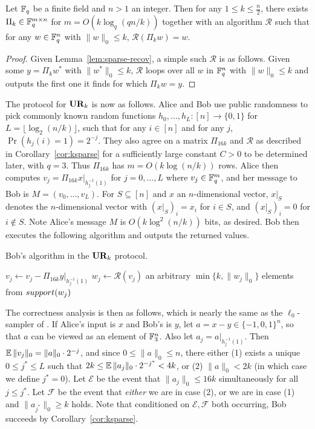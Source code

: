 \begin{corollary}\label{cor:ksparse}
Let $\mathbb{F}_q$ be a finite field and $n>1$ an integer. Then for any $1\le k\le \frac n2$, there exists $\Pi_k\in \mathbb{F}_q^{m\times n}$ for $m = O(k\log_q(qn/k))$ together with an algorithm $\mathcal{R}$ such that for any $w\in\mathbb{F}_q^n$ with $\|w\|_0 \le k$, $\mathcal{R}(\Pi_k w) = w$.
\end{corollary}
\begin{proof}
Given Lemma~\ref{lem:sparse-recov}, a simple such $\mathcal{R}$ is as follows. Given some $y = \Pi_k w^*$ with $\|w^*\|_0 \le k$, $\mathcal{R}$ loops over all $w$ in $\mathbb{F}_q^n$ with $\|w\|_0 \le k$ and outputs the first one it finds for which $\Pi_k w = y$.
\end{proof}

The protocol for $\mathbf{UR}_k$ is now as follows. Alice and Bob use public randomness to pick commonly known random functions $h_0,\ldots,h_L:[n]\rightarrow\{0,1\}$ for $L = \lfloor\log_2(n/k)\rfloor$, such that for any $i\in[n]$ and for any $j$, $\Pr(h_j(i) = 1) = 2^{-j}$. They also agree on a matrix $\Pi_{16k}$ and $\mathcal{R}$ as described in Corollary~\ref{cor:ksparse} for a sufficiently large constant $C>0$ to be determined later, with $q = 3$. Thus $\Pi_{16k}$ has $m = O(k\log(n/k))$ rows. Alice then computes $v_j = \Pi_{16k} x|_{h_j^{-1}(1)}$ for $j=0,\ldots,L$ where $v_j\in\mathbb{F}_q^m$, and her message to Bob is $M = (v_0,\ldots,v_L)$. For $S\subseteq [n]$ and $x$ an $n$-dimensional vector, $x|_S$ denotes the $n$-dimensional vector with $(x|_S)_i = x_i$ for $i\in S$, and $(x|_S)_i = 0$ for $i\notin S$. Note Alice's message $M$ is $O(k\log^2(n/k))$ bits, as desired. Bob then executes the following algorithm and outputs the returned values.

\begin{algorithm}[H] 
  \caption{Bob's algorithm in the $\mathbf{UR}_k$ protocol.} \label{algo:bob-protocol}
  \begin{algorithmic}[1]
      \State $v_j \leftarrow v_j - \Pi_{16k} y|_{h_j^{-1}(1)}$
      \State $w_j\leftarrow \mathcal{R}(v_j)$
      \State \Return an arbitrary $\min\{k, \|w_j\|_0\}$ elements from $\mathop{support}(w_j)$
      \EndIf
    \EndFor
    \EndProcedure
  \end{algorithmic}
\end{algorithm}

The correctness analysis is then as follows, which is nearly the same as the $\ell_0$-sampler of \cite{JowhariST11}. If Alice's input is $x$ and Bob's is $y$, let $a = x-y \in \{-1,0,1\}^n$, so that $a$ can be viewed as an element of $\mathbb{F}_3^n$. Also let $a_j = a|_{h_j^{-1}(1)}$. Then $\operatorname*{\mathbb{E}} \|v_j\|_0 = \|a\|_0\cdot 2^{-j}$, and since $0\le \|a\|_0 \le n$, there either (1) exists a unique $0\le j^*\le L$ such that $2k\le \operatorname*{\mathbb{E}}\|a_j\|_0\cdot 2^{-j^*}< 4k$, or (2) $\|a\|_0 < 2k$ (in which case we define $j^* = 0$). Let $\mathcal{E}$ be the event that $\|a_j\|_0 \le 16k$ simultaneously for all $j\le j^*$. Let $\mathcal{F}$ be the event that {\it either} we are in case (2), or we are in case (1) and $\|a_{j^*}\|_0 \ge k$ holds. Note that conditioned on $\mathcal{E}, \mathcal{F}$ both occurring, Bob succeeds by Corollary~\ref{cor:ksparse}.

